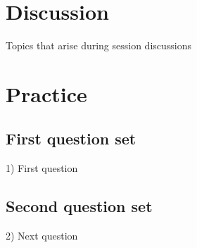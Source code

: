 \documentclass[11pt,a4paper]{article}
\begin{document}
\section{Discussion}

Topics that arise during session discussions

\section{Practice}

\subsection{First question set}

1) First question

\subsection{Second question set}

2) Next question

\newpage



\end{document}
